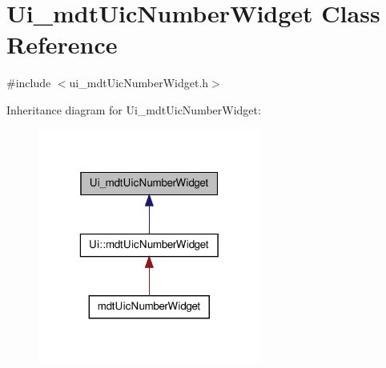 \hypertarget{class_ui__mdt_uic_number_widget}{\section{Ui\-\_\-mdt\-Uic\-Number\-Widget Class Reference}
\label{class_ui__mdt_uic_number_widget}
}


{\ttfamily \#include $<$ui\-\_\-mdt\-Uic\-Number\-Widget.\-h$>$}



Inheritance diagram for Ui\-\_\-mdt\-Uic\-Number\-Widget\-:
\nopagebreak
\begin{figure}[H]
\begin{center}
\leavevmode
\includegraphics[width=208pt]{class_ui__mdt_uic_number_widget__inherit__graph}
\end{center}
\end{figure}


